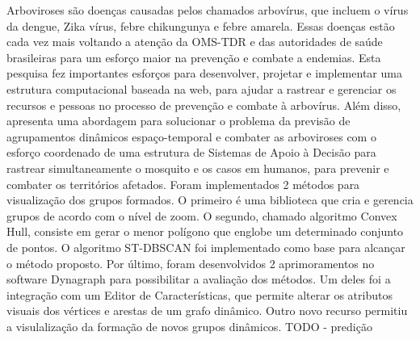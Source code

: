 Arboviroses são doenças causadas pelos chamados arbovírus, que incluem o vírus da dengue, Zika vírus, febre chikungunya e febre amarela. Essas doenças estão cada vez mais voltando a atenção da OMS-TDR e das autoridades de saúde brasileiras para um esforço maior na prevenção e combate a endemias. Esta pesquisa fez importantes esforços para desenvolver, projetar e implementar uma estrutura computacional baseada na web, para ajudar a rastrear e gerenciar os recursos e pessoas no processo de prevenção e combate à arbovírus. Além disso, apresenta uma abordagem para solucionar o problema da previsão de agrupamentos dinâmicos espaço-temporal e combater as arboviroses com o esforço coordenado de uma estrutura de Sistemas de Apoio à Decisão para rastrear simultaneamente o mosquito e os casos em humanos, para prevenir e combater os territórios afetados.
 Foram implementados 2 métodos para visualização dos grupos formados.
O primeiro é uma biblioteca que cria e gerencia grupos de acordo com o nível de zoom.
O segundo, chamado algoritmo Convex Hull, consiste em gerar o menor polígono que englobe um determinado
conjunto de pontos. O algoritmo ST-DBSCAN foi implementado como base para alcançar o método proposto.
Por último, foram desenvolvidos 2 aprimoramentos no software Dynagraph para
possibilitar a avaliação dos métodos. Um deles foi a integração com um Editor de
Características, que permite alterar os atributos visuais dos vértices e arestas de um
grafo dinâmico. Outro novo recurso permitiu a visulalização da formação de novos grupos dinâmicos.
TODO - predição


